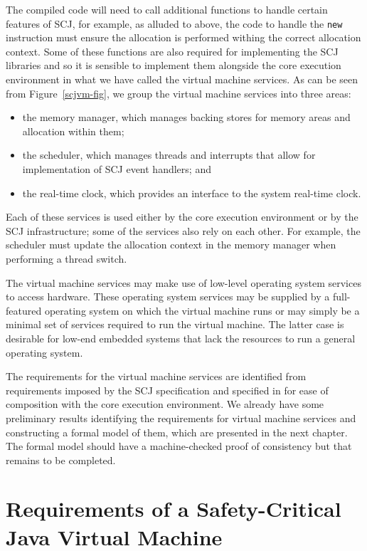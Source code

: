 \documentclass[a4paper,10pt]{report}
\begin{document}
The compiled code will need to call additional functions to handle certain
features of SCJ, for example, as alluded to above, the code to handle the
\texttt{new} instruction must ensure the allocation is performed withing the
correct allocation context.  Some of these functions are also required for
implementing the SCJ libraries and so it is sensible to implement them alongside
the core execution environment in what we have called the virtual machine
services.  As can be seen from Figure~\ref{scjvm-fig}, we group the virtual
machine services into three areas:
\begin{itemize}
\item the memory manager, which manages backing stores for memory areas and
  allocation within them;
\item the scheduler, which manages threads and interrupts that allow for
  implementation of SCJ event handlers; and
\item the real-time clock, which provides an interface to the system real-time
  clock.
\end{itemize}
Each of these services is used either by the core execution environment or by
the SCJ infrastructure; some of the services also rely on each other.  For
example, the scheduler must update the allocation context in the memory manager
when performing a thread switch.

The virtual machine services may make use of low-level operating system
services to access hardware.  These operating system services may be supplied by
a full-featured operating system on which the virtual machine runs or may simply
be a minimal set of services required to run the virtual machine.  The latter
case is desirable for low-end embedded systems that lack the resources to
run a general operating system.

The requirements for the virtual machine services are identified from
requirements imposed by the SCJ specification and specified in \Circus{} for
ease of composition with the core execution environment.  We already have some
preliminary results identifying the requirements for virtual machine services
and constructing a formal model of them, which are presented in the next
chapter.  The formal model should have a machine-checked proof of consistency
but that remains to be completed.


\chapter{Requirements of a Safety-Critical Java Virtual Machine}
\label{requirements-chapter}
\end{document}
